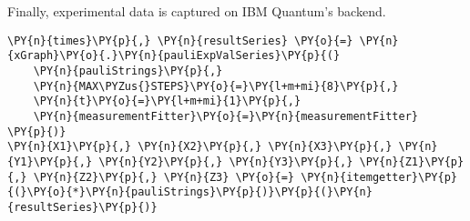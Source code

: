     Finally, experimental data is captured on IBM Quantum's backend.

    \begin{tcolorbox}[breakable, size=fbox, boxrule=1pt, pad at break*=1mm,colback=cellbackground, colframe=cellborder]
\begin{Verbatim}[commandchars=\\\{\}]
\PY{n}{times}\PY{p}{,} \PY{n}{resultSeries} \PY{o}{=} \PY{n}{xGraph}\PY{o}{.}\PY{n}{pauliExpValSeries}\PY{p}{(}
    \PY{n}{pauliStrings}\PY{p}{,}
    \PY{n}{MAX\PYZus{}STEPS}\PY{o}{=}\PY{l+m+mi}{8}\PY{p}{,}
    \PY{n}{t}\PY{o}{=}\PY{l+m+mi}{1}\PY{p}{,}
    \PY{n}{measurementFitter}\PY{o}{=}\PY{n}{measurementFitter}
\PY{p}{)}
\PY{n}{X1}\PY{p}{,} \PY{n}{X2}\PY{p}{,} \PY{n}{X3}\PY{p}{,} \PY{n}{Y1}\PY{p}{,} \PY{n}{Y2}\PY{p}{,} \PY{n}{Y3}\PY{p}{,} \PY{n}{Z1}\PY{p}{,} \PY{n}{Z2}\PY{p}{,} \PY{n}{Z3} \PY{o}{=} \PY{n}{itemgetter}\PY{p}{(}\PY{o}{*}\PY{n}{pauliStrings}\PY{p}{)}\PY{p}{(}\PY{n}{resultSeries}\PY{p}{)}
\end{Verbatim}
\end{tcolorbox}

